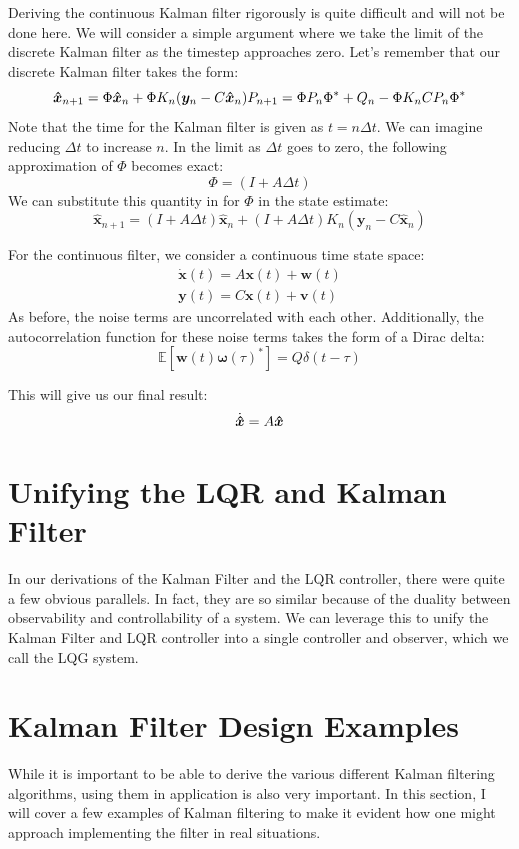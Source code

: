 Deriving the continuous Kalman filter rigorously is quite difficult and will not be done here. We will consider a simple argument where we take the limit of the discrete Kalman filter as the timestep approaches zero. Let's remember that our discrete Kalman filter takes the form:
$$\bm{\hat{x}}_{n+1}=\Phi \bm{\hat{x}}_{n}+\Phi K_n(\bm{y}_n-C\bm{\hat{x}}_n)\\
\color{black}P_{n+1}=\Phi P_n\Phi^*+Q_n-\Phi K_nCP_n\Phi^*$$
Note that the time for the Kalman filter is given as $t=n\Delta t$. We can imagine reducing $\Delta t$ to increase $n$. In the limit as $\Delta t$ goes to zero, the following approximation of $\Phi$ becomes exact:
$$\Phi=(I+A\Delta t)$$
We can substitute this quantity in for $\Phi$ in the state estimate:
$$\bm{\hat{x}}_{n+1}=(I+A\Delta t) \bm{\hat{x}}_{n}+(I+A\Delta t) K_n(\bm{y}_n-C\bm{\hat{x}}_n)$$


For the continuous filter, we consider a continuous time state space:
\begin{gather}
    \bm{\dot{x}}(t)=A\bm{x}(t)+\bm{w}(t)\\
    \bm{y}(t)=C\bm{x}(t)+\bm{v}(t)
\end{gather}
As before, the noise terms are uncorrelated with each other. Additionally, the autocorrelation function for these noise terms takes the form of a Dirac delta:
$$\mathbb{E}[\bm{w}(t)\bm{\omega}(\tau)^*]=Q\delta(t-\tau)$$


This will give us our final result:
$$\dot{\bm{\hat{x}}}=A\bm{\hat{x}}$$


\section{Unifying the LQR and Kalman Filter}
In our derivations of the Kalman Filter and the LQR controller, there were quite a few obvious parallels. In fact, they are so similar because of the duality between observability and controllability of a system. We can leverage this to unify the Kalman Filter and LQR controller into a single controller and observer, which we call the LQG system.



\section{Kalman Filter Design Examples}
While it is important to be able to derive the various different Kalman filtering algorithms, using them in application is also very important. In this section, I will cover a few examples of Kalman filtering to make it evident how one might approach implementing the filter in real situations.


